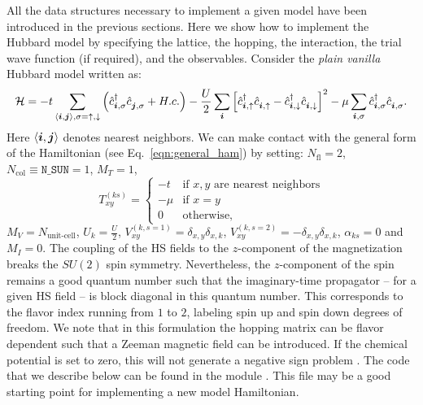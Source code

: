 

All the data structures necessary to implement a given model have been introduced in the previous sections. Here we show how to implement the Hubbard model  by specifying the lattice, the hopping, the interaction, the trial wave function  (if  required), and the observables.  Consider  the  \textit{plain vanilla}  Hubbard model  written as: 
\begin{equation}
\label{eqn_hubbard_Mz}
\mathcal{H}=
- t 
\sum\limits_{\langle \ve{i}, \ve{j} \rangle,  \sigma={\uparrow,\downarrow}} 
  \left(  \hat{c}^{\dagger}_{\ve{i}, \sigma} \hat{c}^{\phantom\dagger}_{\ve{j},\sigma}  + H.c. \right) 
- \frac{U}{2}\sum\limits_{\ve{i}}\left[
\hat{c}^{\dagger}_{\ve{i}, \uparrow} \hat{c}^{\phantom\dagger}_{\ve{i}, \uparrow}  -   \hat{c}^{\dagger}_{\ve{i}, \downarrow} \hat{c}^{\phantom\dagger}_{\ve{i}, \downarrow}  \right]^{2}   
-  \mu \sum_{\ve{i},\sigma } \hat{c}^{\dagger}_{\ve{i}, \sigma}  \hat{c}^{\phantom\dagger}_{\ve{i},\sigma}. 
\end{equation} 
Here $ \langle \boldsymbol{i}, \boldsymbol{j} \rangle $    denotes nearest neighbors. 
We can make contact with the general form of the Hamiltonian  (see Eq.~\ref{eqn:general_ham}) by setting: 
$N_{\mathrm{fl}} = 2$, $N_{\mathrm{col}} \equiv \texttt{N\_SUN}     =1 $, 
 $M_T    =    1$, 
 \begin{equation}
  T^{(ks)}_{x y}   = 
  \left\{ 
 \begin{array}{ll}
       -t         & \text{if } x,y \text{ are nearest neighbors} \\
       -\mu    & \text{if } x = y \\
       0         &  \text{otherwise},
 \end{array}
  \right.
 \end{equation}
 $M_V   =  N_{\text{unit-cell}} $,  $U_{k}       =   \frac{U}{2}$, 
 $V_{x y}^{(k, s=1)} =  \delta_{x,y} \delta_{x,k}  $,  $V_{x y}^{(k, s=2)} =  - \delta_{x,y} \delta_{x,k}  $,  $\alpha_{ks}   = 0  $ and $M_I       = 0 $.   
The coupling of the HS fields to the $z$-component of the magnetization breaks the $SU(2)$ spin symmetry. Nevertheless, the $z$-component of the spin remains a good quantum number such that the imaginary-time propagator -- for a given HS field -- is block  diagonal in this quantum number. This corresponds to the flavor index running from $1$ to $2$,  labeling spin up and spin down degrees of freedom. We note that  in this formulation the  hopping matrix can be flavor dependent such that a Zeeman  magnetic field can be introduced.  If the chemical potential is set to zero, this will not generate a negative sign problem \cite{Wu04,Milat04,Bercx09}.    
The code that we describe below  can be found in the module . This file may be a good starting point for implementing a new model Hamiltonian. 

